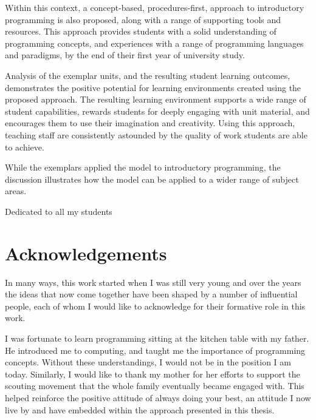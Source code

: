 Within this context, a concept-based, procedures-first, approach to introductory programming is also proposed, along with a range of supporting tools and resources. This approach provides students with a solid understanding of programming concepts, and experiences with a range of programming languages and paradigms, by the end of their first year of university study. 

Analysis of the exemplar units, and the resulting student learning outcomes, demonstrates the positive potential for learning environments created using the proposed approach. The resulting learning environment supports a wide range of student capabilities, rewards students for deeply engaging with unit material, and encourages them to use their imagination and creativity. Using this approach, teaching staff are consistently astounded by the quality of work students are able to achieve.

While the exemplars applied the model to introductory programming, the discussion illustrates how the model can be applied to a wider range of subject areas. 

\newpage \vspace*{8cm} 
\begin{center}
	\large Dedicated to all my students
\end{center}


\chapter*{Acknowledgements}
\vspace{-0.5cm}
In many ways, this work started when I was still very young and over the years the ideas that now come together have been shaped by a number of influential people, each of whom I would like to acknowledge for their formative role in this work.

I was fortunate to learn programming sitting at the kitchen table with my father. He introduced me to computing, and taught me the importance of programming concepts. Without these understandings, I would not be in the position I am today. Similarly, I would like to thank my mother for her efforts to support the scouting movement that the whole family eventually became engaged with. This helped reinforce the positive attitude of always doing your best, an attitude I now live by and have embedded within the approach presented in this thesis.

